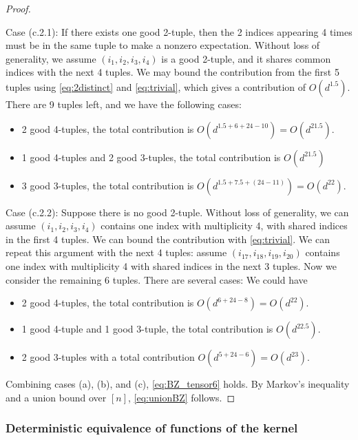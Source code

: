\documentclass[twoside,11pt]{article}
\newcommand{\1}{\mathbf{1}}
\begin{document}
\begin{proof}
\begin{itemize}
       Case (c.2.1): If there exists one good 2-tuple, then the 2 indices appearing 4 times must be in the same tuple to make a nonzero expectation. Without loss of generality, we assume $(i_1,i_2,i_3,i_4)$ is a good 2-tuple, and it shares common indices with the next 4 tuples. We may bound the contribution from the first 5 tuples using \eqref{eq:2distinct} and \eqref{eq:trivial}, which gives a contribution of $O(d^{1.5})$. There are 9 tuples left, and we have the following cases:
       \begin{itemize}
           \item 2 good 4-tuples, the total contribution is $O(d^{1.5+6+24-10})=O(d^{21.5})$.
           \item 1 good 4-tuples and 2 good 3-tuples, the total contribution is $O(d^{21.5})$
           \item 3 good 3-tuples, the total contribution is $O(d^{1.5+7.5+(24-11)})=O(d^{22})$.
       \end{itemize}
        Case (c.2.2): Suppose there is no good 2-tuple.
       Without loss of generality, we can assume $(i_1,i_2,i_3,i_4)$ contains one index with multiplicity 4, with shared indices in the first 4 tuples. We can bound the contribution with \eqref{eq:trivial}. We can repeat this argument with the next 4 tuples: assume $(i_{17},i_{18},i_{19},i_{20})$ contains one index with multiplicity 4 with shared indices in the next 3 tuples. Now we consider the remaining 6 tuples. There are several cases:
      We  could have
       \begin{itemize}
           \item 2 good 4-tuples, the total contribution is $O(d^{6+24-8})=O(d^{22})$.
           \item 1 good 4-tuple and 1 good 3-tuple, the total contribution is $O(d^{22.5})$.
           \item 2 good 3-tuples with a total contribution $O(d^{5+24-6})=O(d^{23})$.
       \end{itemize}
      
   \end{itemize} 
   Combining cases (a), (b), and (c), \eqref{eq:BZ_tensor6} holds. By Markov's inequality and a union bound over $[n]$,  \eqref{eq:unionBZ} follows.
\end{proof}

\subsubsection{Deterministic equivalence of functions of the kernel}
\end{document}
